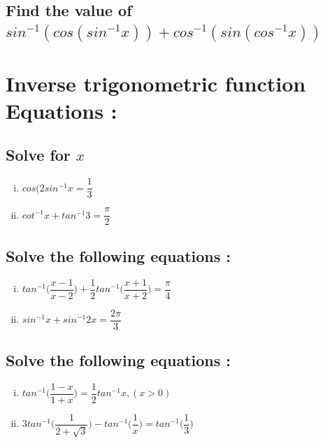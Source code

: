 \documentclass[a4paper,10pt]{article}
\begin{document}
\subsection{Find the value of
$sin^{-1}(cos(sin^{-1}x))+cos^{-1}(sin(cos^{-1}x))$}
\section{Inverse trigonometric function Equations :}
\subsection{Solve for $x$}
\begin{multicols}{2}
\begin{enumerate}[(i)]
\item $cos(2sin^{-1}x = \dfrac{1}{3}$
\item $cot^{-1}x+tan^{-1}3 = \dfrac{\pi}{2}$
\end{enumerate}
\end{multicols}
\subsection{Solve the following equations :}
\begin{multicols}{2}
\begin{enumerate}[(i)]
\item
$tan^{-1}\bigg(\dfrac{x-1}{x-2}\bigg)+\dfrac{1}{2}tan^{-1}\bigg(\dfrac{x+1}{x+2}\bigg)
= \dfrac{\pi}{4}$
\item $sin^{-1}x+sin^{-1}2x = \dfrac{2\pi}{3}$  
\end{enumerate}
\end{multicols}
\subsection{Solve the following equations :}
\begin{enumerate}[(i)]
\item $tan^{-1}\bigg(\dfrac{1-x}{1+x}\bigg) = \dfrac{1}{2}tan^{-1}x,
(x>0)$
\item
$3tan^{-1}\bigg(\dfrac{1}{2+\sqrt{3}}\bigg)-tan^{-1}\bigg(\dfrac{1}{x}\bigg)
= tan^{-1}\bigg(\dfrac{1}{3}\bigg)$
\end{enumerate}
\end{document}
